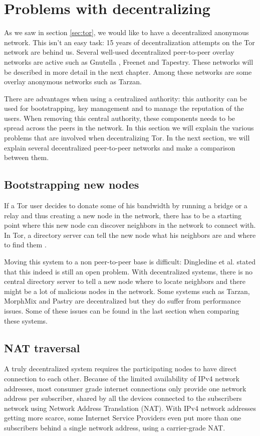 \documentclass{article}
\begin{document}
\section{Problems with decentralizing}
	\label{sec:problems}

	As we saw in section \ref{sec:tor}, we would like to have a decentralized anonymous network. This isn't an easy task: 15 years of decentralization attempts on the Tor network are behind us. Several well-used decentralized peer-to-peer overlay networks are active such as Gnutella \cite{ripeanu2001peer}, Freenet \cite{lua2005survey} and Tapestry. These networks will be described in more detail in the next chapter. Among these networks are some overlay anonymous networks such as Tarzan.

	There are advantages when using a centralized authority: this authority can be used for bootstrapping, key management and to manage the reputation of the users. When removing this central authority, these components needs to be spread across the peers in the network. In this section we will explain the various problems that are involved when decentralizing Tor. In the next section, we will explain several decentralized peer-to-peer networks and make a comparison between them.

	\subsection{Bootstrapping new nodes}
		If a Tor user decides to donate some of his bandwidth by running a bridge or a relay and thus creating a new node in the network, there has to be a starting point where this new node can discover neighbors in the network to connect with. In Tor, a directory server can tell the new node what his neighbors are and where to find them \cite{dingledine2004tor}.
		
		Moving this system to a non peer-to-peer base is difficult: Dingledine et al. stated that this indeed is still an open problem. With decentralized systems, there is no central directory server to tell a new node where to locate neighbors and there might be a lot of malicious nodes in the network. Some systems such as Tarzan, MorphMix and Pastry \cite{rowstron2001pastry, rennhard2002introducing} are decentralized but they do suffer from performance issues. Some of these issues can be found in the last section when comparing these systems.

	\subsection{NAT traversal}
		A truly decentralized system requires the participating nodes to have direct connection to each other. Because of the limited availability of IPv4 network addresses, most consumer grade internet connections only provide one network address per subscriber, shared by all the devices connected to the subscribers network using Network Address Translation (NAT). With IPv4 network addresses getting more scarce, some Internet Service Providers even put more than one subscribers behind a single network address, using a carrier-grade NAT.
		
\end{document}

